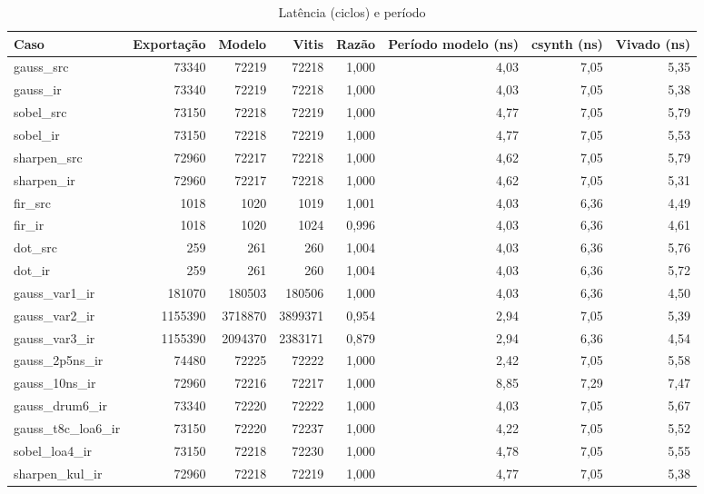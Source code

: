 \begin{table}[htbp]
\centering
\caption{Latência (ciclos) e período}
\begin{tabular}{|l|r|r|r|r|r|r|r|}
\hline
\rowcolor{tabAzul}\color{white}Caso & \color{white}Exportação & \color{white}Modelo & \color{white}Vitis & \color{white}Razão & \color{white}Período modelo (ns) & \color{white}csynth (ns) & \color{white}Vivado (ns) \\
\hline
gauss\_src & 73340 & 72219 & 72218 & 1,000 & 4,03 & 7,05 & 5,35 \\ \hline
gauss\_ir & 73340 & 72219 & 72218 & 1,000 & 4,03 & 7,05 & 5,38 \\ \hline
sobel\_src & 73150 & 72218 & 72219 & 1,000 & 4,77 & 7,05 & 5,79 \\ \hline
sobel\_ir & 73150 & 72218 & 72219 & 1,000 & 4,77 & 7,05 & 5,53 \\ \hline
sharpen\_src & 72960 & 72217 & 72218 & 1,000 & 4,62 & 7,05 & 5,79 \\ \hline
sharpen\_ir & 72960 & 72217 & 72218 & 1,000 & 4,62 & 7,05 & 5,31 \\ \hline
fir\_src & 1018 & 1020 & 1019 & 1,001 & 4,03 & 6,36 & 4,49 \\ \hline
fir\_ir & 1018 & 1020 & 1024 & 0,996 & 4,03 & 6,36 & 4,61 \\ \hline
dot\_src & 259 & 261 & 260 & 1,004 & 4,03 & 6,36 & 5,76 \\ \hline
dot\_ir & 259 & 261 & 260 & 1,004 & 4,03 & 6,36 & 5,72 \\ \hline
gauss\_var1\_ir & 181070 & 180503 & 180506 & 1,000 & 4,03 & 6,36 & 4,50 \\ \hline
gauss\_var2\_ir & 1155390 & 3718870 & 3899371 & 0,954 & 2,94 & 7,05 & 5,39 \\ \hline
gauss\_var3\_ir & 1155390 & 2094370 & 2383171 & 0,879 & 2,94 & 6,36 & 4,54 \\ \hline
gauss\_2p5ns\_ir & 74480 & 72225 & 72222 & 1,000 & 2,42 & 7,05 & 5,58 \\ \hline
gauss\_10ns\_ir & 72960 & 72216 & 72217 & 1,000 & 8,85 & 7,29 & 7,47 \\ \hline
gauss\_drum6\_ir & 73340 & 72220 & 72222 & 1,000 & 4,03 & 7,05 & 5,67 \\ \hline
gauss\_t8c\_loa6\_ir & 73150 & 72220 & 72237 & 1,000 & 4,22 & 7,05 & 5,52 \\ \hline
sobel\_loa4\_ir & 73150 & 72218 & 72230 & 1,000 & 4,78 & 7,05 & 5,55 \\ \hline
sharpen\_kul\_ir & 72960 & 72218 & 72219 & 1,000 & 4,77 & 7,05 & 5,38 \\ \hline

\end{tabular}
\end{table}
